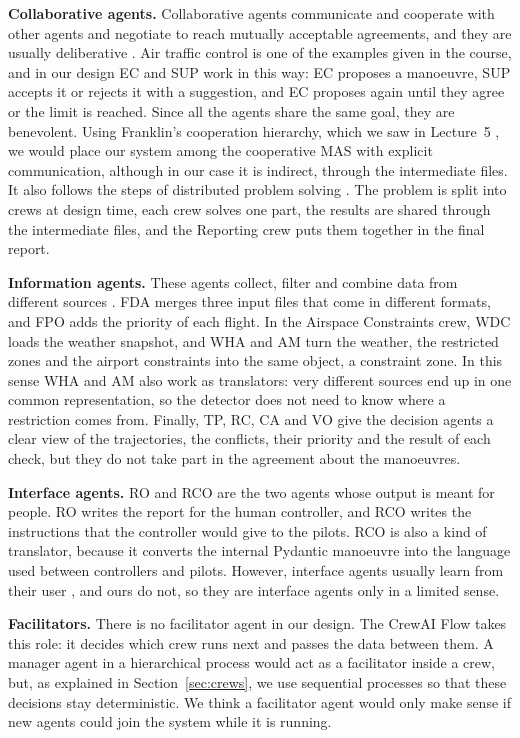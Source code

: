 \textbf{Collaborative agents.} Collaborative agents communicate and cooperate with other
agents and negotiate to reach mutually acceptable agreements, and they are usually
deliberative \cite{lecture3}. Air traffic control is one of the examples given in the
course, and in our design EC and SUP work in this way: EC proposes a manoeuvre, SUP accepts
it or rejects it with a suggestion, and EC proposes again until they agree or the limit is
reached. Since all the agents share the same goal, they are benevolent. Using Franklin's cooperation
hierarchy, which we saw in Lecture~5 \cite{doran1997}, we would place our system among the cooperative MAS
with explicit communication, although in our case it is indirect, through the
intermediate files. It also follows the steps of
distributed problem solving \cite{lecture4}. The problem is split into crews at design time,
each crew solves one part, the results are shared through the intermediate files, and the
Reporting crew puts them together in the final report.

\textbf{Information agents.} These agents collect, filter and combine data from different
sources \cite{lecture3}. FDA merges three input files that come in different formats, and
FPO adds the priority of each flight. In the Airspace Constraints crew, WDC loads the
weather snapshot, and WHA and AM turn the weather, the restricted zones and the airport
constraints into the same object, a constraint zone. In this sense WHA and AM also work as
translators: very different sources end up in one common representation, so the detector
does not need to know where a restriction comes from. Finally, TP, RC, CA and VO give the
decision agents a clear view of the trajectories, the conflicts, their priority and the
result of each check, but they do not take part in the agreement about the manoeuvres.

\textbf{Interface agents.} RO and RCO are the two agents whose output is meant for people.
RO writes the report for the human controller, and RCO writes the instructions that the
controller would give to the pilots. RCO is also a kind of translator, because it converts
the internal Pydantic manoeuvre into the language used between controllers and pilots.
However, interface agents usually learn from their user \cite{lecture3, nwana1996}, and ours do not,
so they are interface agents only in a limited sense.

\textbf{Facilitators.} There is no facilitator agent in our design. The CrewAI Flow takes
this role: it decides which crew runs next and passes the data between them. A manager
agent in a hierarchical process would act as a facilitator inside a crew, but, as
explained in Section~\ref{sec:crews}, we use sequential processes so that these decisions
stay deterministic. We think a facilitator agent would only make sense if new agents could
join the system while it is running.

